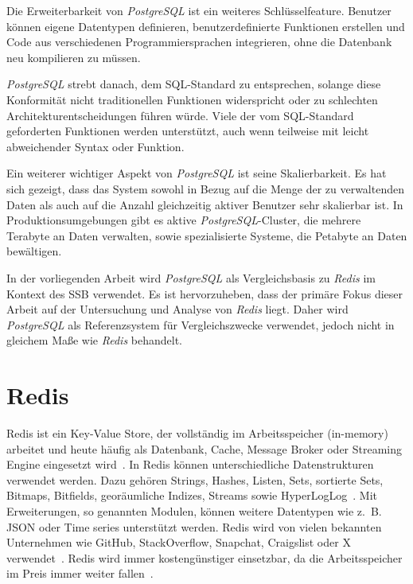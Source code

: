 Die Erweiterbarkeit von \emph{PostgreSQL} ist ein weiteres Schlüsselfeature. Benutzer können eigene Datentypen definieren, benutzerdefinierte Funktionen erstellen und Code aus verschiedenen Programmiersprachen integrieren, ohne die Datenbank neu kompilieren zu müssen.

\emph{PostgreSQL} strebt danach, dem SQL-Standard zu entsprechen, solange diese Konformität nicht traditionellen Funktionen widerspricht oder zu schlechten Architekturentscheidungen führen würde. Viele der vom SQL-Standard geforderten Funktionen werden unterstützt, auch wenn teilweise mit leicht abweichender Syntax oder Funktion.

Ein weiterer wichtiger Aspekt von \emph{PostgreSQL} ist seine Skalierbarkeit. Es hat sich gezeigt, dass das System sowohl in Bezug auf die Menge der zu verwaltenden Daten als auch auf die Anzahl gleichzeitig aktiver Benutzer sehr skalierbar ist. In Produktionsumgebungen gibt es aktive \emph{PostgreSQL}-Cluster, die mehrere Terabyte an Daten verwalten, sowie spezialisierte Systeme, die Petabyte an Daten bewältigen.

In der vorliegenden Arbeit wird \emph{PostgreSQL} als Vergleichsbasis zu \emph{Redis} im Kontext des \ac{SSB} verwendet. Es ist hervorzuheben, dass der primäre Fokus dieser Arbeit auf der Untersuchung und Analyse von \emph{Redis} liegt. Daher wird \emph{PostgreSQL} als Referenzsystem für Vergleichszwecke verwendet, jedoch nicht in gleichem Maße wie \emph{Redis} behandelt.

\section{Redis}

Redis ist ein Key-Value Store, der vollständig im Arbeitsspeicher (in-memory) arbeitet und heute häufig als Datenbank, Cache, Message Broker oder Streaming Engine eingesetzt wird~\cite{redis_ltd_introduction_nodate}.
In Redis können unterschiedliche Datenstrukturen verwendet werden. Dazu gehören Strings, Hashes, Listen, Sets, sortierte Sets, Bitmaps, Bitfields, georäumliche Indizes, Streams sowie HyperLogLog~\cite{redis_ltd_data_nodate}.
Mit Erweiterungen, so genannten Modulen, können weitere Datentypen wie z.~B. JSON oder Time series unterstützt werden.
Redis wird von vielen bekannten Unternehmen wie GitHub, StackOverflow, Snapchat, Craigslist oder X verwendet~\cite{redis_ltd_whos_nodate}.
Redis wird immer kostengünstiger einsetzbar, da die Arbeitsspeicher im Preis immer weiter fallen~\cite{bergai_trends_2020}.

